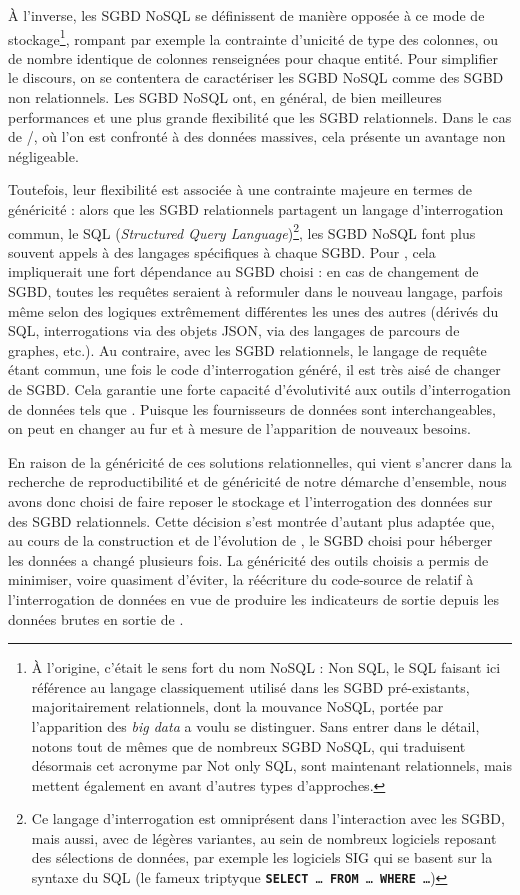 À l'inverse, les SGBD NoSQL se définissent de manière opposée à ce mode de stockage\footnote{
	À l'origine, c'était le sens fort du nom \og NoSQL \fg{} : Non SQL, le SQL faisant ici référence au langage classiquement utilisé dans les SGBD pré-existants, majoritairement relationnels, dont la mouvance NoSQL, portée par l'apparition des \og \textit{big data} \fg{} a voulu se distinguer.
	Sans entrer dans le détail, notons tout de mêmes que de nombreux SGBD NoSQL, qui traduisent désormais cet acronyme par \og Not only SQL\fg{}, sont maintenant relationnels, mais mettent également en avant d'autres types d'approches.
}, rompant par exemple la contrainte d'unicité de type des colonnes, ou de nombre identique de colonnes renseignées pour chaque entité. Pour simplifier le discours, on se contentera de caractériser les SGBD NoSQL comme des SGBD non relationnels.
Les SGBD NoSQL ont, en général, de bien meilleures performances et une plus grande flexibilité que les SGBD relationnels.
Dans le cas de \simedb{}/\simfeodal{}, où l'on est confronté à des données massives, cela présente un avantage non négligeable.

Toutefois, leur flexibilité est associée à une contrainte majeure en termes de généricité : alors que les SGBD relationnels partagent un langage d'interrogation commun, le SQL (\textit{Structured Query Language})\footnote{
	Ce langage d'interrogation est omniprésent dans l'interaction avec les SGBD, mais aussi, avec de légères variantes, au sein de nombreux logiciels reposant des sélections de données, par exemple les logiciels SIG qui se basent sur la syntaxe du SQL (le fameux triptyque \texttt{\textbf{SELECT} \ldots~\textbf{FROM} \ldots{} \textbf{WHERE} \ldots})
}, les SGBD NoSQL font plus souvent appels à des langages spécifiques à chaque SGBD.
Pour \simedb{}, cela impliquerait une fort dépendance au SGBD choisi : en cas de changement de SGBD, toutes les requêtes seraient à reformuler dans le nouveau langage, parfois même selon des logiques extrêmement différentes les unes des autres (dérivés du SQL, interrogations via des objets JSON, via des langages de parcours de graphes, etc.).
Au contraire, avec les SGBD relationnels, le langage de requête étant commun, une fois le code d'interrogation généré, il est très aisé de changer de SGBD.
Cela garantie une forte capacité d'évolutivité aux outils d'interrogation de données tels que \simedb{}.
Puisque les fournisseurs de données sont interchangeables, on peut en changer au fur et à mesure de l'apparition de nouveaux besoins.

En raison de la généricité de ces solutions relationnelles, qui vient s'ancrer dans la recherche de reproductibilité et de généricité de notre démarche d'ensemble, nous avons donc choisi de faire reposer le stockage et l'interrogation des données sur des SGBD relationnels.
Cette décision s'est montrée d'autant plus adaptée que, au cours de la construction et de l'évolution de \simedb{}, le SGBD choisi pour héberger les données a changé plusieurs fois.
La généricité des outils choisis a permis de minimiser, voire quasiment d'éviter, la réécriture du code-source de \simedb{} relatif à l'interrogation de données en vue de produire les indicateurs de sortie depuis les données brutes en sortie de \simfeodal{}.


